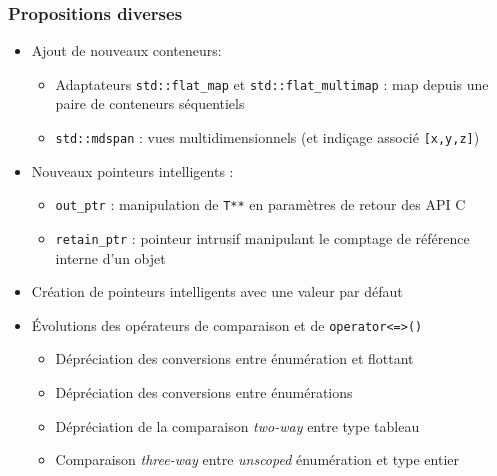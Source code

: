 \documentclass[C++.tex]{subfiles}
\begin{document}
\begin{frame}[fragile]
	\frametitle{Propositions diverses}
	\begin{itemize}
		\item Ajout de nouveaux \og conteneurs\fg{}:
		\begin{itemize}
			\item Adaptateurs \lstinline|std::flat_map| et \lstinline|std::flat_multimap| : map depuis une paire de conteneurs séquentiels
			\item \lstinline|std::mdspan| : vues multidimensionnels (et indiçage associé \lstinline|[x,y,z]|)

		\end{itemize}

		\item Nouveaux pointeurs intelligents :
		\begin{itemize}
			\item \lstinline|out_ptr| : manipulation de \lstinline|T**| en paramètres de retour des API C
			\item \lstinline|retain_ptr| : pointeur intrusif manipulant le comptage de référence interne d'un objet
		\end{itemize}
		\item Création de pointeurs intelligents avec une valeur par défaut
		\item Évolutions des opérateurs de comparaison et de \lstinline|operator<=>()|
		\begin{itemize}
			\item Dépréciation des conversions entre énumération et flottant
			\item Dépréciation des conversions entre énumérations
			\item Dépréciation de la comparaison \og \textit{two-way}\fg{} entre type tableau
			\item Comparaison \og \textit{three-way}\fg{} entre \textit{unscoped} énumération et type entier


		\end{itemize}
	\end{itemize}
\end{frame}
\end{document}
